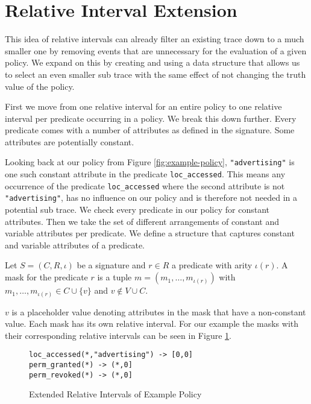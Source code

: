 \section{Relative Interval Extension}

This idea of relative intervals can already filter an existing trace down to a much smaller one by removing events that are unnecessary for the evaluation of a given policy.
We expand on this by creating and using a data structure that allows us to select an even smaller sub trace with the same effect of not changing the truth value of the policy.

First we move from one relative interval for an entire policy to one relative interval per predicate occurring in a policy.
We break this down further.
Every predicate comes with a number of attributes as defined in the signature.
Some attributes are potentially constant.

Looking back at our policy from Figure \ref{fig:example-policy}, \texttt{"advertising"} is one such constant attribute in the predicate \texttt{loc\_accessed}.
This means any occurrence of the predicate \texttt{loc\_accessed} where the second attribute is not \texttt{"advertising"}, has no influence on our policy and is therefore not needed in a potential sub trace.
We check every predicate in our policy for constant attributes.
Then we take the set of different arrangements of constant and variable attributes per predicate.
We define a structure that captures constant and variable attributes of a predicate.
\begin{definition}
    \label{def:mask}
    Let $S=(C,R,\iota)$ be a signature and $r \in R$ a predicate with arity $\iota(r)$.
    A mask for the predicate $r$ is a tuple $m=(m_1, \dots, m_{\iota(r)})$ with $m_1, \dots, m_{\iota(r)} \in C \cup \{v\}$ and $v \not\in V \cup C$.
\end{definition}
$v$ is a placeholder value denoting attributes in the mask that have a non-constant value.
Each mask has its own relative interval.
For our example the masks with their corresponding relative intervals can be seen in Figure \ref{fig:example-ext-intervals}.

\begin{figure}[H]
    \label{fig:example-ext-intervals}
\begin{verbatim}
loc_accessed(*,"advertising") -> [0,0]
perm_granted(*) -> (*,0]
perm_revoked(*) -> (*,0]
\end{verbatim}
    \caption{Extended Relative Intervals of Example Policy}
\end{figure}


